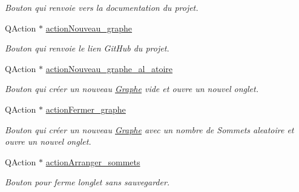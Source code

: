 \begin{DoxyCompactItemize}
\begin{DoxyCompactList}\small\item\em Bouton qui renvoie vers la documentation du projet. \end{DoxyCompactList}\item 
\mbox{\label{classUi__MainWindow_aaee16cd45163dc5a3b54974267b58f66}} 
Q\+Action $\ast$ \hyperlink{classUi__MainWindow_aaee16cd45163dc5a3b54974267b58f66}{action\+Nouveau\+\_\+graphe}
\begin{DoxyCompactList}\small\item\em Bouton qui renvoie le lien Git\+Hub du projet. \end{DoxyCompactList}\item 
\mbox{\label{classUi__MainWindow_aaef1d5f1f01bb3149d790be5286cea93}} 
Q\+Action $\ast$ \hyperlink{classUi__MainWindow_aaef1d5f1f01bb3149d790be5286cea93}{action\+Nouveau\+\_\+graphe\+\_\+al\+\_\+atoire}
\begin{DoxyCompactList}\small\item\em Bouton qui cr\'{e}er un nouveau \hyperlink{classGraphe}{Graphe} vide et ouvre un nouvel onglet. \end{DoxyCompactList}\item 
\mbox{\label{classUi__MainWindow_a1a8ad9d05331516e64adacc2b79f9dab}} 
Q\+Action $\ast$ \hyperlink{classUi__MainWindow_a1a8ad9d05331516e64adacc2b79f9dab}{action\+Fermer\+\_\+graphe}
\begin{DoxyCompactList}\small\item\em Bouton qui cr\'{e}er un nouveau \hyperlink{classGraphe}{Graphe} avec un nombre de Sommets aleatoire et ouvre un nouvel onglet. \end{DoxyCompactList}\item 
\mbox{\label{classUi__MainWindow_a25c76815c42dd7e041f5ce4bd62d82c0}} 
Q\+Action $\ast$ \hyperlink{classUi__MainWindow_a25c76815c42dd7e041f5ce4bd62d82c0}{action\+Arranger\+\_\+sommets}
\begin{DoxyCompactList}\small\item\em Bouton pour ferme l\textquotesingle{}onglet sans sauvegarder. \end{DoxyCompactList}\item 
\mbox{\label{classUi__MainWindow_a916d6accc699ec09971de6e086049674}} 

\end{DoxyCompactItemize}

